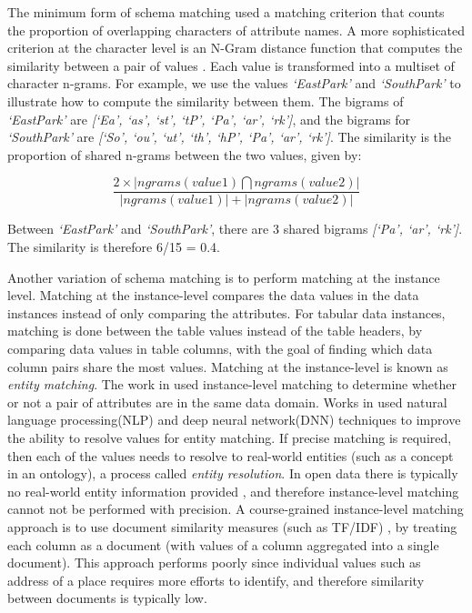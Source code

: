 The minimum form of schema matching used a matching criterion that counts the proportion of overlapping characters of attribute names. A more sophisticated criterion at the character level is an N-Gram distance function that computes the similarity between a pair of values \cite{loper-bird-2002-nltk}. Each value is transformed into a multiset of character n-grams. For example, we use the values \textit{`EastPark'} and \textit{`SouthPark'} to illustrate how to compute the similarity between them. The bigrams of \textit{`EastPark'} are \textit{[`Ea', `as', `st', `tP', `Pa', `ar', `rk']}, and the bigrams for \textit{`SouthPark'} are \textit{[`So', `ou', `ut', `th', `hP', `Pa', `ar', `rk']}. The similarity is the proportion of shared n-grams between the two values, given by:

\[
\frac{2\times \left|ngrams(value1)\bigcap ngrams(value2)\right|}{\left|ngrams(value1)\right|+\left|ngrams(value2)\right|}
\]

Between \textit{`EastPark'} and \textit{`SouthPark'}, there are 3 shared bigrams \textit{[`Pa', `ar', `rk']}. The similarity is therefore 6/15 = 0.4.

Another variation of schema matching is to perform matching at the instance level. Matching at the instance-level compares the data values in the data instances instead of only comparing the attributes. For tabular data instances, matching is done between the table values instead of the table headers, by comparing data values in table columns, with the goal of finding which data column pairs share the most values. Matching at the instance-level is known as \textit{entity matching}. The work in \cite{Mudgal2018Deep} used instance-level matching to determine whether or not a pair of attributes are in the same data domain. Works in \cite{Rahm2016Case} used natural language processing(NLP) and deep neural network(DNN) techniques to improve the ability to resolve values for entity matching. If precise matching is required, then each of the values needs to resolve to real-world entities (such as a concept in an ontology), a process called \textit{entity resolution}. In open data there is typically no real-world entity information provided \cite{books/sp/bellahsene11}, and therefore instance-level matching cannot not be performed with precision. A course-grained instance-level matching approach is to use document similarity measures (such as TF/IDF) \cite{Duchateau2009YAM}, by treating each column as a document (with values of a column aggregated into a single document). This approach performs poorly since individual values such as address of a place requires more efforts to identify, and therefore similarity between documents is typically low. 

